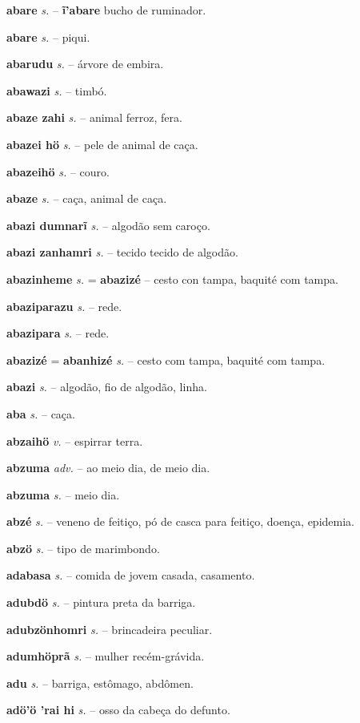 \textbf{abare} \textit{s.} -- \textbf{ĩ'abare} bucho de ruminador.

\textbf{abare} \textit{s.} -- piqui.

\textbf{abarudu} \textit{s.} -- árvore de embira.

\textbf{abawazi} \textit{s.} -- timbó.

\textbf{abaze zahi} \textit{s.} -- animal ferroz, fera.

\textbf{abazei hö} \textit{s.} -- pele de animal de caça.

\textbf{abazeihö} \textit{s.} -- couro.

\textbf{abaze} \textit{s.} -- caça, animal de caça.

\textbf{abazi dumnarĩ} \textit{s.} -- algodão sem caroço.

\textbf{abazi zanhamri} \textit{s.} -- tecido tecido de algodão.

\textbf{abazinheme} \textit{s.} = \textbf{abazizé} -- cesto con tampa, baquité com tampa.

\textbf{abaziparazu} \textit{s.} -- rede.

\textbf{abazipara} \textit{s.} -- rede.

\textbf{abazizé} = \textbf{abanhizé} \textit{s.} -- cesto com tampa, baquité com tampa.

\textbf{abazi} \textit{s.} -- algodão, fio de algodão, linha.

\textbf{aba} \textit{s.} -- caça.

\textbf{abzaihö} \textit{v.} -- espirrar terra.

\textbf{abzuma} \textit{adv.} -- ao meio dia, de meio dia.

\textbf{abzuma} \textit{s.} -- meio dia.

\textbf{abzé} \textit{s.} -- veneno de feitiço, pó de casca para feitiço, doença, epidemia.

\textbf{abzö} \textit{s.} -- tipo de marimbondo.

\textbf{adabasa} \textit{s.} -- comida de jovem casada, casamento.

\textbf{adubdö} \textit{s.} -- pintura preta da barriga.

\textbf{adubzönhomri} \textit{s.} -- brincadeira peculiar.

\textbf{adumhöprã} \textit{s.} -- mulher recém-grávida.

\textbf{adu} \textit{s.} -- barriga, estômago, abdômen.

\textbf{adö'ö 'rai hi} \textit{s.} -- osso da cabeça do defunto.

